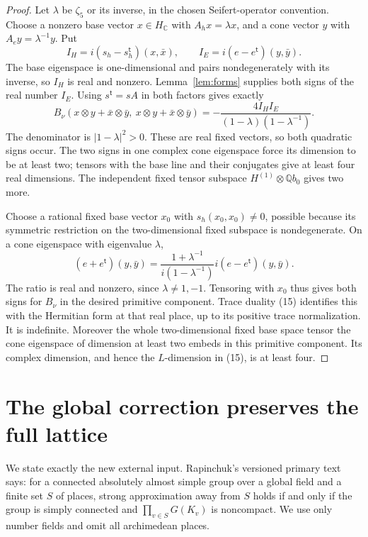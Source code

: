 \documentclass[11pt]{article}
\newcommand{\Q}{\mathbb Q}
\newcommand{\C}{\mathbb C}
\begin{document}
\begin{proof}
Let \(\lambda\) be \(\zeta_5\) or its inverse, in the chosen
Seifert-operator convention. Choose a nonzero base vector
\(x\in H_\C\) with \(A_hx=\lambda x\), and a cone vector
\(y\) with \(A_ey=\lambda^{-1}y\). Put
\[
 I_H=i(s_h-s_h^{\mathsf t})(x,\bar x),\qquad
 I_E=i(e-e^{\mathsf t})(y,\bar y).
 \]
The base eigenspace is one-dimensional and pairs nondegenerately
with its inverse, so \(I_H\) is real and nonzero.
Lemma~\ref{lem:forms} supplies both signs of the real number \(I_E\).
Using \(s^{\mathsf t}=sA\) in both factors gives exactly
\[
 B_\nu(x\otimes y+\bar x\otimes\bar y,\
             x\otimes y+\bar x\otimes\bar y)
   =-\frac{4I_HI_E}{(1-\lambda)(1-\lambda^{-1})}.                \tag{22}
\]
The denominator is \(|1-\lambda|^2>0\). These are real fixed
vectors, so both quadratic signs occur.
The two signs in one complex cone eigenspace force its dimension
to be at least two; tensors with the base line and their conjugates
give at least four real dimensions. The independent fixed tensor
subspace \(H^{(1)}\otimes\Q b_0\) gives two more.

Choose a rational fixed base vector \(x_0\) with
\(s_h(x_0,x_0)\ne0\), possible because its symmetric restriction
on the two-dimensional fixed subspace is nondegenerate.
On a cone eigenspace with eigenvalue \(\lambda\),
\[
 (e+e^{\mathsf t})(y,\bar y)=
  \frac{1+\lambda^{-1}}{i(1-\lambda^{-1})}
          i(e-e^{\mathsf t})(y,\bar y).                         \tag{23}
\]
The ratio is real and nonzero, since \(\lambda\ne1,-1\).
Tensoring with \(x_0\) thus gives both signs for \(B_\nu\)
in the desired primitive component. Trace duality (15) identifies
this with the Hermitian form at that real place, up to its positive
trace normalization. It is indefinite. Moreover the whole
two-dimensional fixed base space tensor the cone eigenspace of
dimension at least two embeds in this primitive component.
Its complex dimension, and hence the \(L\)-dimension in (15),
is at least four.
\end{proof}

\section{The global correction preserves the full lattice}

We state exactly the new external input. Rapinchuk's versioned
primary text \cite[Theorem 2.3]{rapinchuk} says: for a connected
absolutely almost simple group over a global field and a finite
set \(S\) of places, strong approximation away from \(S\) holds
if and only if the group is simply connected and
\(\prod_{v\in S}G(K_v)\) is noncompact. We use only number fields
and omit all archimedean places.
\end{document}
